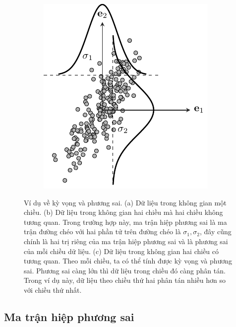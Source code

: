 \begin{figure}[t]
\begin{subfigure}{0.325\textwidth}
\includegraphics[width=0.99\linewidth]{Chapters/07_DimemsionalityReduction/27_pca/latex/pca_var0.pdf}
\caption{}
\label{fig:27_2c}
\end{subfigure}
\caption{
Ví dụ về kỳ vọng và phương sai. (a) Dữ liệu trong không gian
một chiều. (b) Dữ liệu trong không gian hai chiều mà hai chiều
không tương quan. Trong trường hợp này, ma trận hiệp phương sai là ma trận
đường chéo với hai phần tử trên đường chéo  là $\sigma_1, \sigma_2$, đây
cũng chính là hai trị riêng của ma trận hiệp phương sai và là phương sai
của mỗi chiều dữ liệu. (c) Dữ liệu trong không gian hai chiều có tương
quan. Theo mỗi chiều, ta có thể tính được kỳ vọng và phương sai. Phương sai
càng lớn thì dữ liệu trong chiều đó càng phân tán. Trong ví dụ này, dữ liệu
theo chiều thứ hai phân tán nhiều hơn so với chiều thứ nhất. }
\label{fig:27_2}
\end{figure}

\subsection{Ma trận hiệp phương sai}


